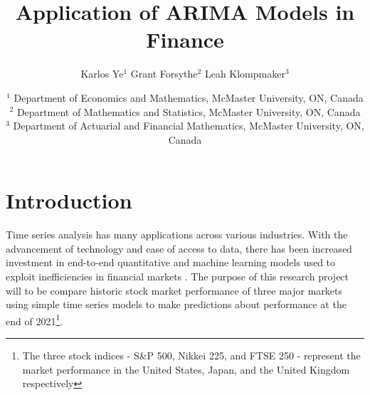 \documentclass[12pt, centerh1]{article}
\title{Application of ARIMA Models in Finance} %
\author{\qquad Karlos Ye$^{1}$ \qquad Grant Forsythe$^{2}$ \qquad Leah Klompmaker$^{3}$}
\date{
{\footnotesize $^1$ Department of Economics and Mathematics, McMaster University, ON, Canada\\[-6pt]
               $^2$ Department of Mathematics and Statistics, McMaster University, ON, Canada\\[-6pt]
               $^3$ Department of Actuarial and Financial Mathematics, McMaster University, ON, Canada\\[-6pt]}
}
\begin{document}
\maketitle
\vspace{-8mm} %
\begin{abstract}

\end{abstract}
\newpage

\section{Introduction}

Time series analysis has many applications across various industries. With the advancement of technology and ease of access to data, there has been increased investment in end-to-end quantitative and machine learning models used to exploit inefficiencies in financial markets \citep{coqueret2021machine}. The purpose of this research project will to be compare historic stock market performance of three major markets using simple time series models to make predictions about performance at the end of 2021\footnote{The three stock indices - S\&P 500, Nikkei 225, and FTSE 250 - represent the market performance in the United States, Japan, and the United Kingdom respectively}. 
\end{document}
